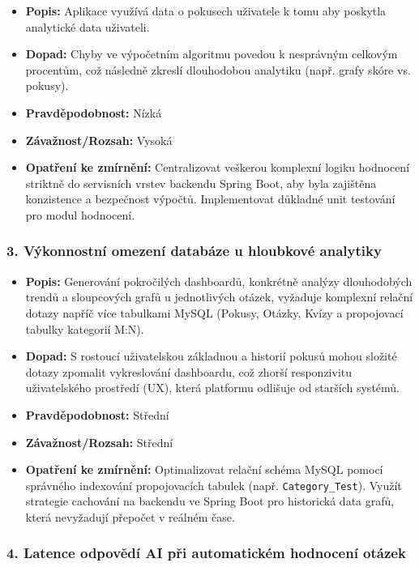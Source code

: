 \documentclass{vskpou} %
\begin{document}
\begin{itemize}
    \item \textbf{Popis:} Aplikace využívá data o pokusech uživatele k tomu aby poskytla analytické data uživateli.
    \item \textbf{Dopad:} Chyby ve výpočetním algoritmu povedou k nesprávným celkovým procentům, což následně zkreslí dlouhodobou analytiku (např. grafy skóre vs. pokusy).
    \item \textbf{Pravděpodobnost:} Nízká
    \item \textbf{Závažnost/Rozsah:} Vysoká
    \item \textbf{Opatření ke zmírnění:} Centralizovat veškerou komplexní logiku hodnocení striktně do servisních vrstev backendu Spring Boot, aby byla zajištěna konzistence a bezpečnost výpočtů. Implementovat důkladné unit testování pro modul hodnocení.
\end{itemize}

\subsubsection*{3. Výkonnostní omezení databáze u hloubkové analytiky}

\begin{itemize}
    \item \textbf{Popis:} Generování pokročilých dashboardů, konkrétně analýzy dlouhodobých trendů a sloupcových grafů u jednotlivých otázek, vyžaduje komplexní relační dotazy napříč více tabulkami MySQL (Pokusy, Otázky, Kvízy a propojovací tabulky kategorií M:N).
    \item \textbf{Dopad:} S rostoucí uživatelskou základnou a historií pokusů mohou složité dotazy zpomalit vykreslování dashboardu, což zhorší responzivitu uživatelského prostředí (UX), která platformu odlišuje od starších systémů.
    \item \textbf{Pravděpodobnost:} Střední
    \item \textbf{Závažnost/Rozsah:} Střední
    \item \textbf{Opatření ke zmírnění:} Optimalizovat relační schéma MySQL pomocí správného indexování propojovacích tabulek (např. \texttt{Category\_Test}). Využít strategie cachování na backendu ve Spring Boot pro historická data grafů, která nevyžadují přepočet v reálném čase.
\end{itemize}

\subsubsection*{4. Latence odpovědí AI při automatickém hodnocení otázek}
\end{document}
